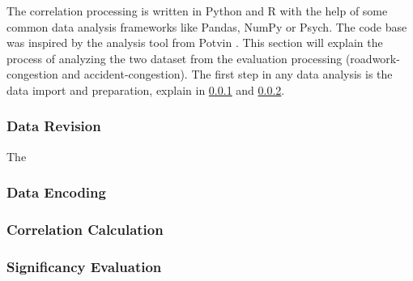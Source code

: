 The correlation processing is written in Python and R with the help of some common data analysis frameworks like Pandas, NumPy or Psych. The code base was inspired by the analysis tool from Potvin \parencite{Potvin2020}. This section will explain the process of analyzing the two dataset from the evaluation processing (roadwork-congestion and accident-congestion). The first step in any data analysis is the data import and preparation, explain in \cref{methodology_correlation_processing_revision} and \cref{methodology_correlation_processing_encoding}.

\subsubsection{Data Revision}
\label{methodology_correlation_processing_revision}
The 

\subsubsection{Data Encoding}
\label{methodology_correlation_processing_encoding}

\subsubsection{Correlation Calculation}
\label{methodology_correlation_processing_correlation}

\subsubsection{Significancy Evaluation}
\label{methodology_correlation_processing_significanc}




